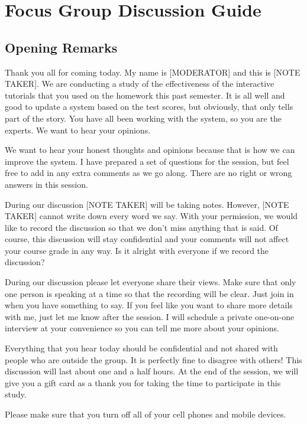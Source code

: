 \chapter[Focus Group Discussion Guide]{Focus Group Discussion Guide}

\section{Opening Remarks}

Thank you all for coming today. My name is [MODERATOR] and this is [NOTE TAKER]. We are conducting a study of the effectiveness of the interactive tutorials that you used on the homework this past semester. It is all well and good to update a system based on the test scores, but obviously, that only tells part of the story. You have all been working with the system, so you are the experts. We want to hear your opinions.

We want to hear your honest thoughts and opinions because that is how we can improve the system. I have prepared a set of questions for the session, but feel free to add in any extra comments as we go along. There are no right or wrong answers in this session.

During our discussion [NOTE TAKER] will be taking notes. However, [NOTE TAKER] cannot write down every word we say. With your permission, we would like to record the discussion so that we don’t miss anything that is said. Of course, this discussion will stay confidential and your comments will not affect your course grade in any way. Is it alright with everyone if we record the discussion?

During our discussion please let everyone share their views. Make sure that only one person is speaking at a time so that the recording will be clear. Just join in when you have something to say. If you feel like you want to share more details with me, just let me know after the session. I will schedule a private one-on-one interview at your convenience so you can tell me more about your opinions.

Everything that you hear today should be confidential and not shared with people who are outside the group. It is perfectly fine to disagree with others!
This discussion will last about one and a half hours. At the end of the session, we will give you a gift card as a thank you for taking the time to participate in this study.

Please make sure that you turn off all of your cell phones and mobile devices.

